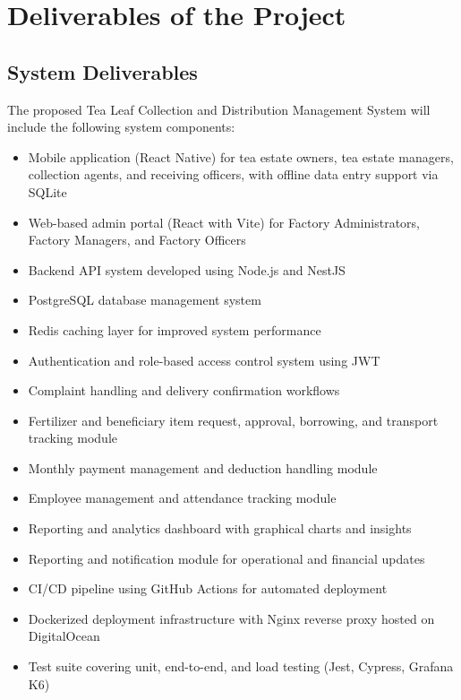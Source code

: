 \section{Deliverables of the Project}
\label{sec:deliverables}

\subsection{System Deliverables}
The proposed Tea Leaf Collection and Distribution Management System will include the following system components:
\begin{itemize}
    \item Mobile application (React Native) for tea estate owners, tea estate managers, collection agents, and receiving officers, with offline data entry support via SQLite
    \item Web-based admin portal (React with Vite) for Factory Administrators, Factory Managers, and Factory Officers
    \item Backend API system developed using Node.js and NestJS
    \item PostgreSQL database management system
    \item Redis caching layer for improved system performance
    \item Authentication and role-based access control system using JWT
    \item Complaint handling and delivery confirmation workflows
    \item Fertilizer and beneficiary item request, approval, borrowing, and transport tracking module
    \item Monthly payment management and deduction handling module
    \item Employee management and attendance tracking module
    \item Reporting and analytics dashboard with graphical charts and insights
    \item Reporting and notification module for operational and financial updates
    \item CI/CD pipeline using GitHub Actions for automated deployment
    \item Dockerized deployment infrastructure with Nginx reverse proxy hosted on DigitalOcean
    \item Test suite covering unit, end-to-end, and load testing (Jest, Cypress, Grafana K6)
\end{itemize}

